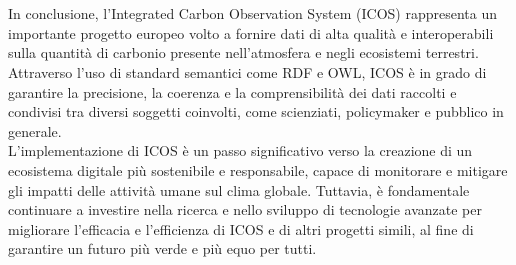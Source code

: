 \chapter{\conclusionsname}
\label{chap:conclusions}
In conclusione, l'Integrated Carbon Observation System
(ICOS) rappresenta un importante progetto europeo 
volto a fornire dati di alta qualità e interoperabili
sulla quantità di carbonio presente nell'atmosfera e
negli ecosistemi terrestri.\\

Attraverso l'uso di standard semantici come RDF e OWL,
ICOS è in grado di garantire la precisione,
la coerenza e la comprensibilità dei dati raccolti
e condivisi tra diversi soggetti coinvolti,
come scienziati, policymaker e pubblico in generale.\\

L'implementazione di ICOS è un passo significativo
verso la creazione di un ecosistema digitale
più sostenibile e responsabile, capace di
monitorare e mitigare gli impatti delle attività
umane sul clima globale. Tuttavia, è fondamentale
continuare a investire nella ricerca e nello
sviluppo di tecnologie avanzate per migliorare
l'efficacia e l'efficienza di ICOS e di altri
progetti simili, al fine di garantire un futuro
più verde e più equo per tutti.